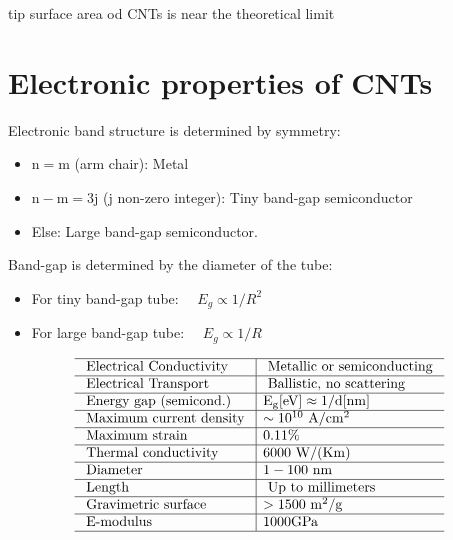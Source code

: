 \documentclass[12pt,english]{article}
\begin{document}
tip surface area od CNTs is near the theoretical limit

\section*{Electronic properties of CNTs}
Electronic band structure is determined by symmetry:
\begin{itemize}
    \item $\mathrm{n}=\mathrm{m}$ (arm chair): Metal
    \item $\mathrm{n}-\mathrm{m}=3 \mathrm{j}$ (j non-zero integer): Tiny band-gap semiconductor
    \item Else: Large band-gap semiconductor.
\end{itemize}



\noindent
Band-gap is determined by the diameter of the tube:
\begin{itemize}
    \item For tiny band-gap tube: $\quad E_{g} \propto 1 / R^{2}$

    \item For large band-gap tube: $\quad E_{g} \propto 1 / R$

\end{itemize}




$$
\begin{array}{l|l}
\hline \text { Electrical Conductivity } & \text { Metallic or semiconducting } \\
\hline \text { Electrical Transport } & \text { Ballistic, no scattering } \\
\hline \text { Energy gap (semicond.) } & \mathrm{E}_{\mathrm{g}}[\mathrm{eV}] \approx 1 / \mathrm{d}[\mathrm{nm}] \\
\hline \text { Maximum current density } & \sim 10^{10} \mathrm{~A} / \mathrm{cm}^{2} \\
\hline \text { Maximum strain } & 0.11 \% \\
\hline \text { Thermal conductivity } & 6000 \mathrm{~W} /(\mathrm{Km}) \\
\hline \text { Diameter } & 1-100 \mathrm{~nm} \\
\hline \text { Length } & \text { Up to millimeters } \\
\hline \text { Gravimetric surface } & >1500 \mathrm{~m}^{2} / \mathrm{g} \\
\hline \text { E-modulus } & 1000 \mathrm{GPa} \\
\hline
\end{array}
$$
\end{document}
